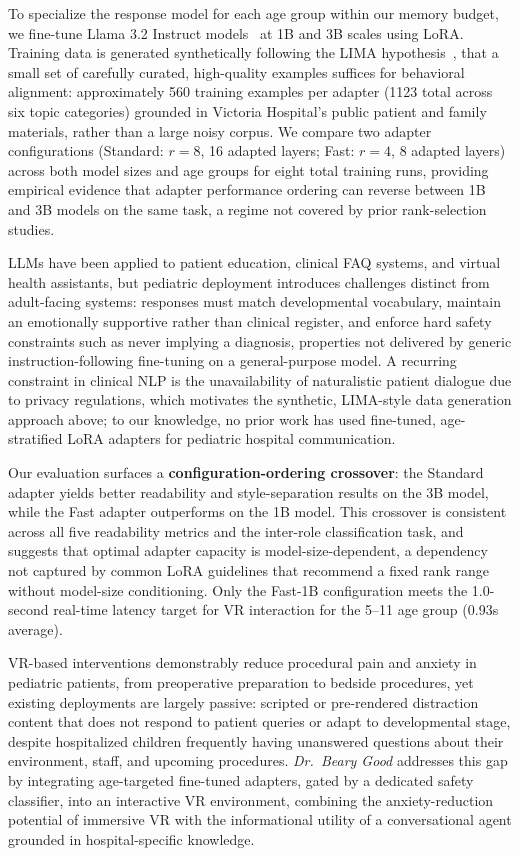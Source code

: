 \documentclass[pdflatex,sn-mathphys-num]{sn-jnl}%
\begin{document}
To specialize the response model for each age group within our memory budget, we fine-tune Llama 3.2 Instruct models~\cite{dubey2024llama3} at 1B and 3B scales using LoRA. Training data is generated synthetically following the LIMA hypothesis~\cite{zhou2023lima}, that a small set of carefully curated, high-quality examples suffices for behavioral alignment: approximately 560 training examples per adapter (1123 total across six topic categories) grounded in Victoria Hospital's public patient and family materials, rather than a large noisy corpus. We compare two adapter configurations (Standard: $r=8$, 16 adapted layers; Fast: $r=4$, 8 adapted layers) across both model sizes and age groups for eight total training runs, providing empirical evidence that adapter performance ordering can reverse between 1B and 3B models on the same task, a regime not covered by prior rank-selection studies.

LLMs have been applied to patient education, clinical FAQ systems, and virtual health assistants, but pediatric deployment introduces challenges distinct from adult-facing systems: responses must match developmental vocabulary, maintain an emotionally supportive rather than clinical register, and enforce hard safety constraints such as never implying a diagnosis, properties not delivered by generic instruction-following fine-tuning on a general-purpose model. A recurring constraint in clinical NLP is the unavailability of naturalistic patient dialogue due to privacy regulations, which motivates the synthetic, LIMA-style data generation approach above; to our knowledge, no prior work has used fine-tuned, age-stratified LoRA adapters for pediatric hospital communication.

Our evaluation surfaces a \textbf{configuration-ordering crossover}: the Standard adapter yields better readability and style-separation results on the 3B model, while the Fast adapter outperforms on the 1B model. This crossover is consistent across all five readability metrics and the inter-role classification task, and suggests that optimal adapter capacity is model-size-dependent, a dependency not captured by common LoRA guidelines that recommend a fixed rank range without model-size conditioning. Only the Fast-1B configuration meets the 1.0-second real-time latency target for VR interaction for the 5--11 age group (0.93s average).

VR-based interventions demonstrably reduce procedural pain and anxiety in pediatric patients, from preoperative preparation to bedside procedures, yet existing deployments are largely passive: scripted or pre-rendered distraction content that does not respond to patient queries or adapt to developmental stage, despite hospitalized children frequently having unanswered questions about their environment, staff, and upcoming procedures. \textit{Dr.\ Beary Good} addresses this gap by integrating age-targeted fine-tuned adapters, gated by a dedicated safety classifier, into an interactive VR environment, combining the anxiety-reduction potential of immersive VR with the informational utility of a conversational agent grounded in hospital-specific knowledge.
\end{document}

